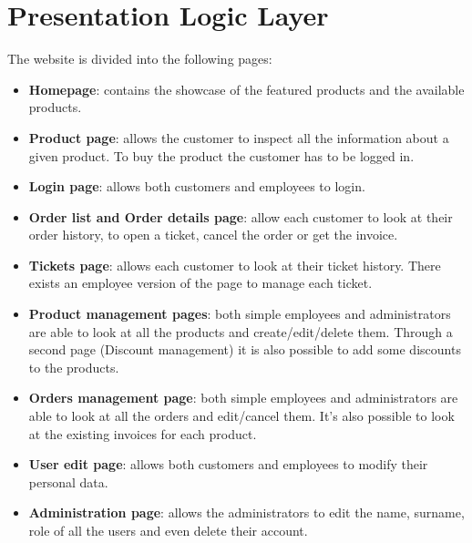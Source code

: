 \section{Presentation Logic Layer}


The website is divided into the following pages:
\begin{itemize}
    \item \textbf{Homepage}: contains the showcase of the featured products and the available products.
    \item \textbf{Product page}: allows the customer to inspect all the information about a given product. To buy the product the customer has to be logged in.
    \item \textbf{Login page}: allows both customers and employees to login. 
    \item \textbf{Order list and Order details page}: allow each customer to look at their order history, to open a ticket, cancel the order or get the invoice.
    \item \textbf{Tickets page}: allows each customer to look at their ticket history. There exists an employee version of the page to manage each ticket.
    \item \textbf{Product management pages}: both simple employees and administrators are able to look at all the products and create/edit/delete them. Through a second page (Discount management) it is also possible to add some discounts to the products.
    \item \textbf{Orders management page}: both simple employees and administrators are able to look at all the orders and edit/cancel them. It's also possible to look at the existing invoices for each product.
    \item \textbf{User edit page}: allows both customers and employees to modify their personal data. 
    \item \textbf{Administration page}: allows the administrators to edit the name, surname, role of all the users and even delete their account.
\end{itemize}

